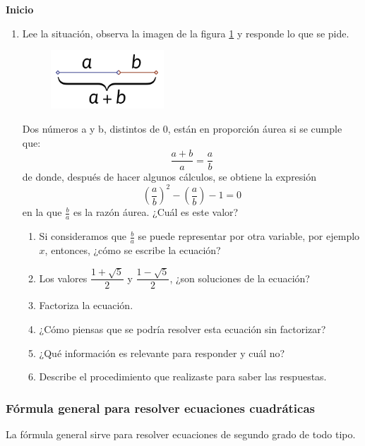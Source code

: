 \documentclass[11pt]{book}
\begin{document}
\begin{boxK}
  \begin{center}\textbf{Inicio}\end{center}
  \begin{enumerate}
    \item Lee la situación, observa la imagen de la figura \ref{fig:ayb} y responde lo que se pide.
          \begin{figure}[H]
            \centering
            \includegraphics[width=0.4\textwidth]{ayb.png}
            \label{fig:ayb}
          \end{figure}
          \begin{boxF}
            Dos números a y b, distintos de 0, están en proporción áurea si se cumple que:
            \[\dfrac{a + b}{a}=\dfrac{a}{b}\]
            de donde, después de hacer algunos cálculos, se obtiene la expresión
            \[ \left(\dfrac{a}{b}\right)^2-\left(\dfrac{a}{b}\right)-1=0\]
            en la que $\frac{b}{a}$ es la razón áurea. ¿Cuál es este valor?
          \end{boxF}
          \begin{enumerate}
            \item Si consideramos que $\frac{b}{a}$ se puede representar por otra variable, por ejemplo $x$, entonces, ¿cómo se escribe la ecuación?
            \item Los valores $\dfrac{1+\sqrt{5}}{2}$ y $\dfrac{1-\sqrt{5}}{2}$, ¿son soluciones de la ecuación?
            \item Factoriza la ecuación.
            \item ¿Cómo piensas que se podría resolver esta ecuación sin factorizar?
            \item ¿Qué información es relevante para responder y cuál no?
            \item Describe el procedimiento que realizaste para saber las respuestas.
          \end{enumerate}
  \end{enumerate}
\end{boxK}

\subsubsection{Fórmula general para resolver ecuaciones cuadráticas}
La fórmula general sirve para resolver ecuaciones de segundo grado de todo tipo.
\end{document}
